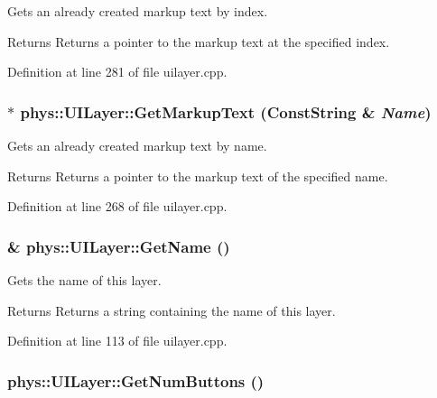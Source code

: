Gets an already created markup text by index. 

\begin{DoxyReturn}{Returns}
Returns a pointer to the markup text at the specified index. 
\end{DoxyReturn}


Definition at line 281 of file uilayer.cpp.

\hypertarget{classphys_1_1UILayer_abadb760dd330e6963e27ad725d44ce74}{
\subsubsection[{GetMarkupText}]{ $\ast$ phys::UILayer::GetMarkupText ({\bf ConstString} \& {\em Name})}}
\label{da/d48/classphys_1_1UILayer_abadb760dd330e6963e27ad725d44ce74}


Gets an already created markup text by name. 

\begin{DoxyReturn}{Returns}
Returns a pointer to the markup text of the specified name. 
\end{DoxyReturn}


Definition at line 268 of file uilayer.cpp.

\hypertarget{classphys_1_1UILayer_af69573dd43356fa8cf1672ac405f788e}{
\subsubsection[{GetName}]{ \& phys::UILayer::GetName ()}}
\label{da/d48/classphys_1_1UILayer_af69573dd43356fa8cf1672ac405f788e}


Gets the name of this layer. 

\begin{DoxyReturn}{Returns}
Returns a string containing the name of this layer. 
\end{DoxyReturn}


Definition at line 113 of file uilayer.cpp.

\hypertarget{classphys_1_1UILayer_a07ff0fc6febb6704f6cf78aa5b7a6fb9}{
\subsubsection[{GetNumButtons}]{ phys::UILayer::GetNumButtons ()}}
\label{da/d48/classphys_1_1UILayer_a07ff0fc6febb6704f6cf78aa5b7a6fb9}


